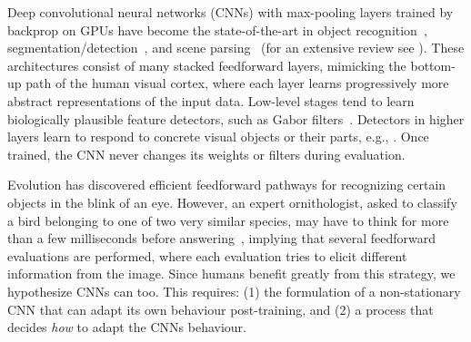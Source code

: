 Deep convolutional neural networks (CNNs) \cite{Fukushima:1979neocognitron} with max-pooling layers \cite{weng1992} trained by backprop \cite{LeCun:89,ranzato:2007,scherer:2010} on GPUs \cite{ciresan:2011ijcai} have become
the state-of-the-art in object recognition~\cite{ciresan2012cvpr,Krizhevsky:2012,wan2013regularization,goodfellow2013maxout},
segmentation/detection~\cite{miccai2013,Ciresan:2012f},
and scene parsing~\cite{farabet2013learning,sermanet-cvpr-2013,sermanet2013overfeat} (for an extensive review 
see \cite{schmidhuber2014deep}).
These architectures consist of many stacked feedforward layers,
mimicking the bottom-up path of the human visual cortex, where each
layer learns progressively more abstract representations of the input
data. Low-level stages tend to learn biologically plausible feature
detectors, such as Gabor filters~\citep{gabor1946}.  Detectors in higher layers learn to
respond to concrete visual objects or their
parts, e.g., \cite{zeiler2013visualize,simonyan2013visual,Zeiler2011AdaptiveDeconvolutionalNetworks,quoc:2012}.
Once trained, the CNN never changes its weights or filters during
evaluation.


Evolution has discovered efficient feedforward pathways for 
recognizing certain objects in the blink of an eye.  However, an
expert ornithologist, asked to classify a bird belonging to one of two
very similar species, may have to think for more than a few
milliseconds before answering~\cite{branson2010visual,
  WelinderEtal2010}, implying that several feedforward evaluations are
performed, where each evaluation tries to elicit different information
from the image.  Since humans benefit greatly from this strategy, we
hypothesize CNNs can too.  This requires: (1) the formulation of a
non-stationary CNN that can adapt its own behaviour post-training, and
(2) a process that decides \emph{how} to adapt the CNNs behaviour.

